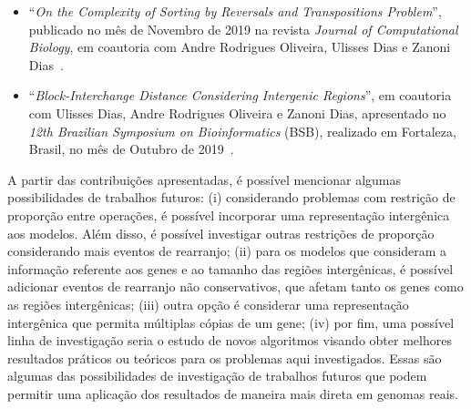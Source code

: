 \begin{itemize}
  \item ``\textit{On the Complexity of Sorting by Reversals and Transpositions Problem}'', publicado no mês de Novembro de 2019 na revista \textit{Journal of Computational Biology}, em coautoria com Andre Rodrigues Oliveira, Ulisses Dias e Zanoni Dias~\cite{2019b-oliveira-etal}.

  \item ``\textit{Block-Interchange Distance Considering Intergenic Regions}'', em coautoria com Ulisses Dias, Andre Rodrigues Oliveira e Zanoni Dias, apresentado no \textit{12th Brazilian Symposium on Bioinformatics} (BSB), realizado em Fortaleza, Brasil, no mês de Outubro de 2019~\cite{2019-dias-etal}.
\end{itemize}

A partir das contribuições apresentadas, é possível mencionar algumas possibilidades de trabalhos futuros: (i) considerando problemas com restrição de proporção entre operações, é possível incorporar uma representação intergênica aos modelos. Além disso, é possível investigar outras restrições de proporção considerando mais eventos de rearranjo; (ii) para os modelos que consideram a informação referente aos genes e ao tamanho das regiões intergênicas, é possível adicionar eventos de rearranjo não conservativos, que afetam tanto os genes como as regiões intergênicas; (iii) outra opção é considerar uma representação intergênica que permita múltiplas cópias de um gene; (iv) por fim, uma possível linha de investigação seria o estudo de novos algoritmos visando obter melhores resultados práticos ou teóricos para os problemas aqui investigados.  Essas são algumas das possibilidades de investigação de trabalhos futuros que podem permitir uma aplicação dos resultados de maneira mais direta em genomas reais. 